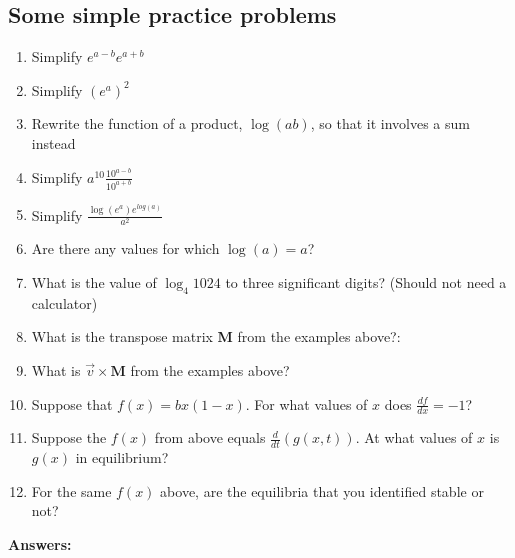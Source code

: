 \documentclass[12pt]{article}
\begin{document}
\subsection{Some simple practice problems}
\begin{enumerate}
\item{} Simplify $e^{a-b}e^{a+b}$
\item{} Simplify $(e^{a})^{2}$
\item{} Rewrite the function of a product, $\log(ab)$, so that it involves a sum instead
\item{} Simplify $a^{10}\frac{10^{a-b}}{10^{a+b}}$
\item{} Simplify $\frac{\log(e^{a})e^{log(a)}}{a^{2}}$
\item{} Are there any values for which $\log(a) = a$?
\item{} What is the value of $\log_{4}1024$ to three significant digits? (Should not need a calculator)
\item{} What is the transpose matrix \textbf{M} from the examples above?:
\item{} What is $\overrightarrow{v}\times\textbf{M}$ from the examples above?
\item{} Suppose that $f(x) = bx(1-x)$. For what values of $x$ does $\frac{df}{dx}=-1$?
\item{} Suppose the $f(x)$ from above equals $\frac{d}{dt}(g(x,t))$. At what values of $x$ is $g(x)$ in equilibrium?
\item{} For the same $f(x)$ above, are the equilibria that you identified stable or not?
\end{enumerate}


\newpage
\textbf{Answers:}
\end{document}
